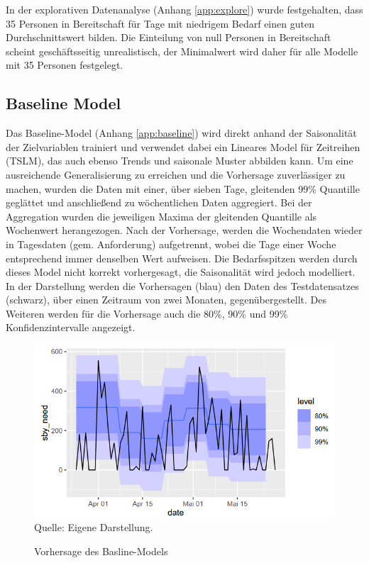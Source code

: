 In der explorativen Datenanalyse (Anhang \ref{app:explore}) wurde festgehalten, dass 35 Personen in Bereitschaft für Tage mit niedrigem Bedarf einen guten Durchschnittswert bilden. Die Einteilung von null Personen in Bereitschaft scheint geschäftsseitig unrealistisch, der Minimalwert wird daher für alle Modelle mit 35 Personen festgelegt.

 \subsection{Baseline Model} 

Das Baseline-Model (Anhang \ref{app:baseline}) wird direkt anhand der Saisonalität der Zielvariablen trainiert und verwendet dabei ein Lineares Model für Zeitreihen (TSLM), das auch ebenso Trends und saisonale Muster abbilden kann. Um eine ausreichende Generalisierung zu erreichen und die Vorhersage zuverlässiger zu machen, wurden die Daten mit einer, über sieben Tage, gleitenden 99\% Quantille  geglättet und anschließend zu wöchentlichen Daten aggregiert. Bei der Aggregation wurden die jeweiligen Maxima der gleitenden Quantille als Wochenwert herangezogen. Nach der Vorhersage, werden die Wochendaten wieder in Tagesdaten (gem. Anforderung) aufgetrennt, wobei die Tage einer Woche entsprechend immer denselben Wert aufweisen. Die Bedarfsspitzen werden durch dieses Model nicht korrekt vorhergesagt, die Saisonalität wird jedoch modelliert. In der Darstellung werden die Vorhersagen (blau) den Daten des Testdatensatzes (schwarz), über einen Zeitraum von zwei Monaten, gegenübergestellt. Des Weiteren werden für die Vorhersage auch die 80\%, 90\% und 99\% Konfidenzintervalle angezeigt.

\begin{figure}[h]
\centering
\caption{Vorhersage des Basline-Models}
\includegraphics[width=15cm]{01_resources/baseline_prediction.png}\\
Quelle: Eigene Darstellung.
\label{fig:baseline}
\end{figure}

